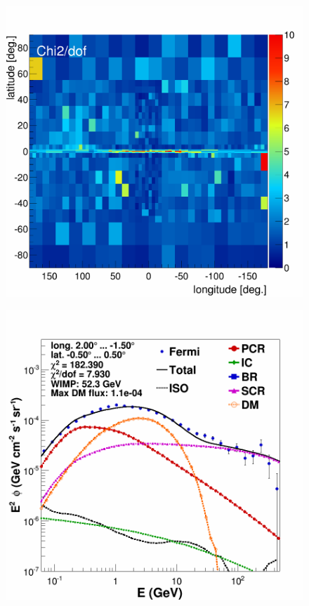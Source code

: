 \begin{figure}[h]
\begin{minipage}[h]{0.45\textwidth}
  	\label{fig:MCRonly_CMZ}
  \end{minipage}
  \hfill
  \begin{minipage}[h]{0.45\textwidth}
  	\centering
	\includegraphics[width=1\linewidth]{pic/results/DMonly_chi2Distribution.png}
  \label{fig:DMonly_chi2Distribution}
  \end{minipage}
  \hfill
  \begin{minipage}[h]{0.45\textwidth}
  	\centering
	\includegraphics[width=1\linewidth]{pic/results/DMonly_CMZ.png}

\end{minipage}
\end{figure}
